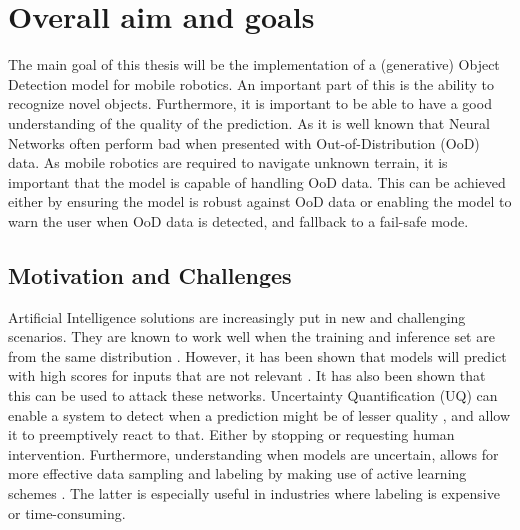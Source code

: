 \section{Overall aim and goals}\label{sec:goals}
The main goal of this thesis will be the implementation of a (generative) Object Detection model for mobile robotics. An important part of this is the ability to recognize novel objects. Furthermore, it is important to be able to have a good understanding of the quality of the prediction. As it is well known that Neural Networks often perform bad when presented with Out-of-Distribution (OoD) data. As mobile robotics are required to navigate unknown terrain, it is important that the model is capable of handling OoD data. This can be achieved either by ensuring the model is robust against OoD data or enabling the model to warn the user when OoD data is detected, and fallback to a fail-safe mode.

\subsection{Motivation and Challenges}

Artificial Intelligence solutions are increasingly put in new and challenging scenarios. They are known to work well when the training and inference set are from the same distribution \cite{krizhevsky2012imagenet}. However, it has been shown that models will predict with high scores for inputs that are not relevant \cite{Nguyen_2015_CVPR,szegedy2013intriguing}. It has also been shown that this can be used to attack these networks\cite{goodfellow2014explaining,dong2018boosting}.
Uncertainty Quantification (UQ) can enable a system to detect when a prediction might be of lesser quality \cite{däubener2020detecting}, and allow it to preemptively react to that\cite{osti_1481629}. Either by stopping or requesting human intervention.
Furthermore, understanding when models are uncertain, allows for more effective data sampling and labeling by making use of active learning schemes \cite{settles2009active,Bernhardt_2022,yang2009effective}. The latter is especially useful in industries where labeling is expensive or time-consuming.


